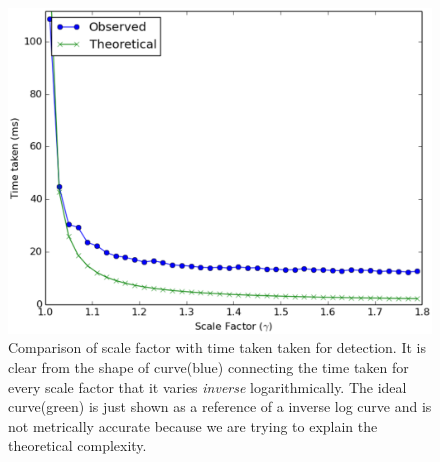 \begin{figure}[h]
    \centering
    \includegraphics[width=\textwidth]{Appendices/figures1/gamma_vs_time}
    \caption{Comparison of scale factor with time taken taken for detection. It is clear from the shape of curve(blue) connecting the time taken for every scale factor that it varies \textit{inverse} logarithmically. The ideal curve(green) is just shown as a reference of a inverse log curve and is not metrically accurate because we are trying to explain the theoretical complexity.}
    \label{two}
\end{figure}
